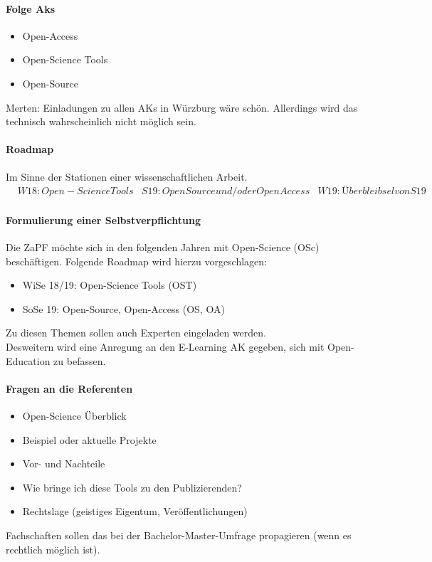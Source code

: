     \paragraph{Folge Aks}
      \begin{itemize}
        \item Open-Access
        \item Open-Science Tools
        \item Open-Source
      \end{itemize}
      Merten: Einladungen zu allen AKs in Würzburg wäre schön. Allerdings wird das technisch wahrscheinlich nicht möglich sein.

    \paragraph{Roadmap}
      Im Sinne der Stationen einer wissenschaftlichen Arbeit.
      \begin{align}
        & W18: Open-Science Tools
        & S19: Open Source und/oder Open Access
        & W19: Überbleibsel von S19
      \end{align}

    \paragraph{Formulierung einer Selbstverpflichtung}
      Die ZaPF möchte sich in den folgenden Jahren mit Open-Science (OSc) beschäftigen. Folgende Roadmap wird hierzu vorgeschlagen:
      \begin{itemize}
        \item WiSe 18/19: Open-Science Tools (OST)
        \item SoSe 19: Open-Source, Open-Access (OS, OA)
      \end{itemize}
      Zu diesen Themen sollen auch Experten eingeladen werden. \\ Desweitern wird eine Anregung an den E-Learning AK gegeben, sich mit Open-Education zu befassen.

    \paragraph{Fragen an die Referenten}
      \begin{itemize}
        \item Open-Science Überblick
        \item Beispiel oder aktuelle Projekte
        \item Vor- und Nachteile
        \item Wie bringe ich diese Tools zu den Publizierenden?
        \item Rechtslage (geistiges Eigentum, Veröffentlichungen)
      \end{itemize}
      Fachschaften sollen das bei der Bachelor-Master-Umfrage propagieren (wenn es rechtlich möglich ist).

